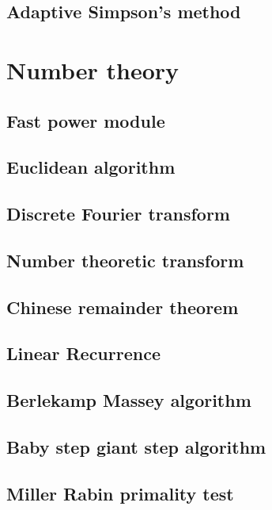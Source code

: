 \documentclass[titlepage, a4paper,10pt]{article}
\begin{document}
\begin{multicols}{2}
\begin{spacing}{0.6}
			\subsection{Adaptive Simpson's method}
				
		\section{Number theory}
			\subsection{Fast power module}
				
			\subsection{Euclidean algorithm}
				
			\subsection{Discrete Fourier transform}
				
			\subsection{Number theoretic transform}
				
			\subsection{Chinese remainder theorem}
				
			\subsection{Linear Recurrence}
				
			\subsection{Berlekamp Massey algorithm}
				
			\subsection{Baby step giant step algorithm}
				
			\subsection{Miller Rabin primality test}
				

\end{spacing}
\end{multicols}
\end{document}
